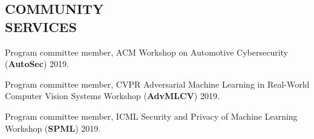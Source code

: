 \documentclass[margin]{res}
\begin{document}
\begin{resume}
\section{COMMUNITY\\ SERVICES}
Program committee member, ACM Workshop on Automotive Cybersecurity (\textbf{AutoSec}) 2019.

Program committee member, CVPR Adversarial Machine Learning in Real-World Computer Vision Systems Workshop (\textbf{AdvMLCV}) 2019.

Program committee member, ICML Security and Privacy of Machine Learning Workshop (\textbf{SPML}) 2019.
\end{resume}
\end{document}
